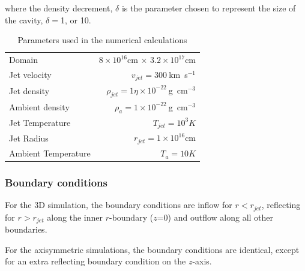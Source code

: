 where the density decrement, $\delta$ is the parameter chosen to represent the size of the cavity, $\delta=$1, or 10.



\begin{table}
\begin{center}
\begin{tabular}{l r}
Domain &  $8\times10^{16}$cm $\times $ $ 3.2\times10^{17}$cm \\
 Jet velocity   & $v_{jet}=300~$km~s$^{-1}$ \\
 Jet density      & $\rho_{jet}=1\eta\times10^{-22}~$g~cm$^{-3}$ \\
 Ambient density  & $\rho_a=1\times10^{-22}~$g~cm$^{-3}$ \\
 Jet Temperature     &$T_{jet}= 10^3 K$ \\
 Jet Radius     &$r_{jet}= 1\times10^{16}$cm \\
 Ambient Temperature &$T_a= 10 K$ \\
 \end{tabular}
 \caption{Parameters used in the numerical calculations}
 \label{DensityGradientSims}
 \end{center}
 \end{table}


\subsubsection{Boundary conditions}

For the 3D simulation, the boundary conditions are inflow for $r<r_{jet}$, reflecting for $r>r_{jet}$ along the inner $r$-boundary ($z$=0) and outflow along all other boundaries.

For the axisymmetric simulations, the boundary conditions are identical, except for an extra reflecting boundary condition on the $z$-axis.


